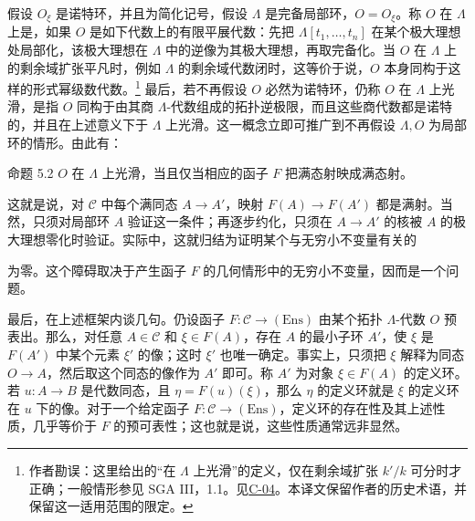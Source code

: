 假设 $O_\xi$ 是诺特环，并且为简化记号，假设 $\Lambda$ 是完备局部环，$O=O_\xi$。称 $O$ 在 $\Lambda$ 上是，如果 $O$ 是如下代数上的有限平展代数：先把 $\Lambda[t_1,\ldots,t_n]$ 在某个极大理想处局部化，该极大理想在 $\Lambda$ 中的逆像为其极大理想，再取完备化。当 $O$ 在 $\Lambda$ 上的剩余域扩张平凡时，例如 $\Lambda$ 的剩余域代数闭时，这等价于说，$O$ 本身同构于这样的形式幂级数代数。\footnote{作者勘误：这里给出的“在 $\Lambda$ 上光滑”的定义，仅在剩余域扩张 $k'/k$ 可分时才正确；一般情形参见 SGA III，1.1。见\hyperref[orig:6]{C-04}。本译文保留作者的历史术语，并保留这一适用范围的限定。}
最后，若不再假设 $O$ 必然为诺特环，仍称 $O$ 在 $\Lambda$ 上光滑，是指 $O$ 同构于由其商 $\Lambda$-代数组成的拓扑逆极限，而且这些商代数都是诺特的，并且在上述意义下于 $\Lambda$ 上光滑。这一概念立即可推广到不再假设 $\Lambda,O$ 为局部环的情形。由此有：
\begin{statement}{命题 5.2}
$O$ 在 $\Lambda$ 上光滑，当且仅当相应的函子 $F$ 把满态射映成满态射。
\end{statement}
这就是说，对 $\mathcal C$ 中每个满同态 $A\to A'$，映射 $F(A)\to F(A')$ 都是满射。当然，只须对局部环 $A$ 验证这一条件；再逐步约化，只须在 $A\to A'$ 的核被 $A$ 的极大理想零化时验证。实际中，这就归结为证明某个与无穷小不变量有关的

为零。这个障碍取决于产生函子 $F$ 的几何情形中的无穷小不变量，因而是一个问题。

最后，在上述框架内谈几句。仍设函子 $F:\mathcal C\to(\mathrm{Ens})$ 由某个拓扑 $\Lambda$-代数 $O$ 预表出。那么，对任意 $A\in\mathcal C$ 和 $\xi\in F(A)$，存在 $A$ 的最小子环 $A'$，使 $\xi$ 是 $F(A')$ 中某个元素 $\xi'$ 的像；这时 $\xi'$ 也唯一确定。事实上，只须把 $\xi$ 解释为同态 $O\to A$，然后取这个同态的像作为 $A'$ 即可。称 $A'$ 为对象 $\xi\in F(A)$ 的定义环。若 $u:A\to B$ 是代数同态，且 $\eta=F(u)(\xi)$，那么 $\eta$ 的定义环就是 $\xi$ 的定义环在 $u$ 下的像。对于一个给定函子 $F:\mathcal C\to(\mathrm{Ens})$，定义环的存在性及其上述性质，几乎等价于 $F$ 的预可表性；这也就是说，这些性质通常远非显然。

